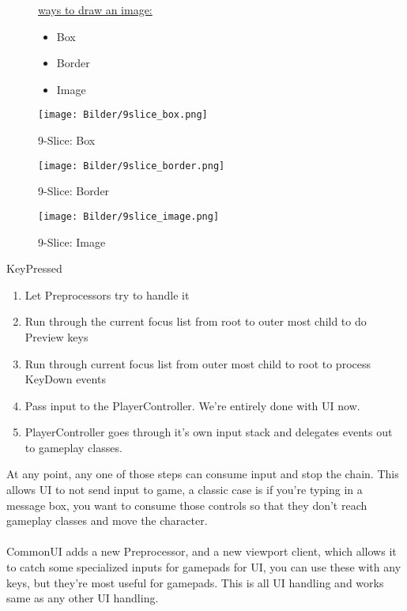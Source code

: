         \begin{figure}[!h]
        \begin{minipage}{\textwidth}
            \begingroup \parfillskip=0pt
                    \minipage{\textwidth}
                        \uline{ways to draw an image:}
                        \begin{itemize}
                            \item Box
                            \item Border
                            \item Image
                        \end{itemize}
                    \endminipage\hfill

                        \texttt{[image: Bilder/9slice\_box.png]}
                        \caption{9-Slice: Box}
                    \endminipage\hfill
                        \texttt{[image: Bilder/9slice\_border.png]}
                        \caption{9-Slice: Border}
                    \endminipage\hfill
                        \texttt{[image: Bilder/9slice\_image.png]}
                        \caption{9-Slice: Image}
                    \endminipage

            \par\endgroup
        \end{minipage}
        \end{figure}
        

\smallskip
\hypertarget{input:UI}{
KeyPressed
\begin{enumerate}
\item Let Preprocessors try to handle it
\item Run through the current focus list from root to outer most child to do Preview keys
\item Run through current focus list from outer most child to root to process KeyDown events
\item Pass input to the PlayerController. We're entirely done with UI now.
\item PlayerController goes through it's own input stack and delegates events out to gameplay classes.
\end{enumerate}
}
At any point, any one of those steps can consume input and stop the chain. This allows UI to not send input to game, a classic case is if you're typing in a  message box, you want to consume those controls so that they don't reach gameplay classes and move the character. \\
\\
CommonUI adds a new Preprocessor, and a new viewport client,
which allows it to catch some specialized inputs for gamepads for UI,
you can use these with any keys, but they're most useful for gamepads.
This is all UI handling and works same as any other UI handling. \\
\\

